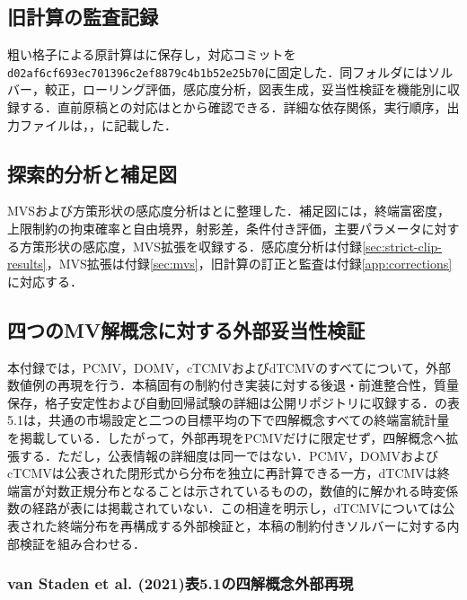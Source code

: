 \documentclass[10pt,a4paper]{article}
\theoremstyle{plain}
\theoremstyle{definition}
\begin{document}
\subsection{旧計算の監査記録}
粗い格子による原計算はに保存し，対応コミットを\texttt{d02af6cf693ec701396c2ef8879c4b1b52e25b70}に固定した．同フォルダにはソルバー，較正，ローリング評価，感応度分析，図表生成，妥当性検証を機能別に収録する．直前原稿との対応はとから確認できる．詳細な依存関係，実行順序，出力ファイルは，，に記載した．

\subsection{探索的分析と補足図}
MVSおよび方策形状の感応度分析はとに整理した．補足図には，終端富密度，上限制約の拘束確率と自由境界，射影差，条件付き評価，主要パラメータに対する方策形状の感応度，MVS拡張を収録する．感応度分析は付録\ref{sec:strict-clip-results}，MVS拡張は付録\ref{sec:mvs}，旧計算の訂正と監査は付録\ref{app:corrections}に対応する．

\subsection{四つのMV解概念に対する外部妥当性検証}
\label{app:four-model-validation}

本付録では，PCMV，DOMV，cTCMVおよびdTCMVのすべてについて，外部数値例の再現を行う．本稿固有の制約付き実装に対する後退・前進整合性，質量保存，格子安定性および自動回帰試験の詳細は公開リポジトリに収録する．\citet{vanStadenDangForsyth2021}の表5.1は，共通の市場設定と二つの目標平均の下で四解概念すべての終端富統計量を掲載している．したがって，外部再現をPCMVだけに限定せず，四解概念へ拡張する．ただし，公表情報の詳細度は同一ではない．PCMV，DOMVおよびcTCMVは公表された閉形式から分布を独立に再計算できる一方，dTCMVは終端富が対数正規分布となることは示されているものの，数値的に解かれる時変係数の経路が表には掲載されていない．この相違を明示し，dTCMVについては公表された終端分布を再構成する外部検証と，本稿の制約付きソルバーに対する内部検証を組み合わせる．

\subsubsection{van Staden et al. (2021)表5.1の四解概念外部再現}
\end{document}
